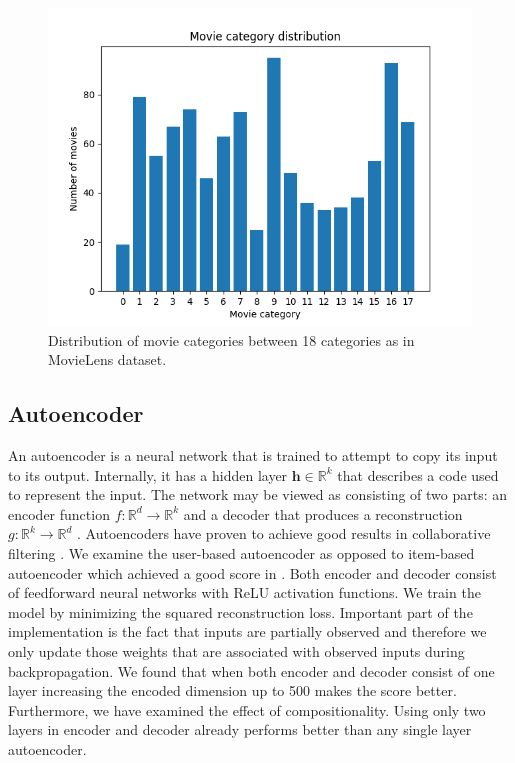 \documentclass[10pt,conference,compsocconf]{IEEEtran}
\begin{document}
    \begin{figure}\label{movie_category_distribution}
        \includegraphics[width=\columnwidth]{figures/movie_category_distribution.png}
        \caption{Distribution of movie categories between 18 categories as in MovieLens dataset.}
    \end{figure}


    \subsection{Autoencoder}
    An autoencoder is a neural network that is trained to attempt to copy its input to its output. 
    Internally, it has a hidden layer $\textbf{h} \in \mathbb{R}^k$ that describes a code used to represent the input.
    The network may be viewed as consisting of two parts: an encoder function $f: \mathbb{R} ^d \rightarrow \mathbb{R} ^k$ and a decoder that produces a reconstruction $g: \mathbb{R} ^k \rightarrow \mathbb{R} ^d$ \cite{Goodfellow-et-al-2016}. Autoencoders have proven to achieve good results in collaborative filtering \cite{inproceedings}. We examine the user-based autoencoder as opposed to item-based autoencoder which achieved a good score in \cite{inproceedings}. Both encoder and decoder consist of feedforward neural networks with ReLU activation functions. We train the model by minimizing the squared reconstruction loss. Important part of the implementation is the fact that inputs are partially observed and therefore we only update those weights that are associated with observed inputs during backpropagation. 
    We found that when both encoder and decoder consist of one layer increasing the encoded dimension up to 500 makes the score better. Furthermore, we have examined the effect of compositionality. Using only two layers in encoder and decoder already performs better than any single layer autoencoder. 
    
\end{document}
